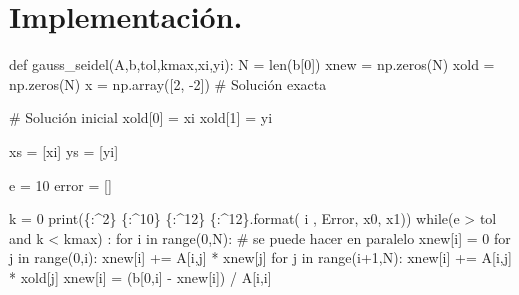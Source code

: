 \documentclass[
  letterpaper,
  DIV=11,
  numbers=noendperiod]{scrreprt}
\newenvironment{Shaded}{\begin{snugshade}}{\end{snugshade}}
\newcommand{\BuiltInTok}[1]{\textcolor[rgb]{0.00,0.23,0.31}{#1}}
\newcommand{\CommentTok}[1]{\textcolor[rgb]{0.37,0.37,0.37}{#1}}
\newcommand{\ControlFlowTok}[1]{\textcolor[rgb]{0.00,0.23,0.31}{#1}}
\newcommand{\DecValTok}[1]{\textcolor[rgb]{0.68,0.00,0.00}{#1}}
\newcommand{\KeywordTok}[1]{\textcolor[rgb]{0.00,0.23,0.31}{#1}}
\newcommand{\NormalTok}[1]{\textcolor[rgb]{0.00,0.23,0.31}{#1}}
\newcommand{\OperatorTok}[1]{\textcolor[rgb]{0.37,0.37,0.37}{#1}}
\newcommand{\SpecialCharTok}[1]{\textcolor[rgb]{0.37,0.37,0.37}{#1}}
\newcommand{\StringTok}[1]{\textcolor[rgb]{0.13,0.47,0.30}{#1}}
\begin{document}
\section{Implementación.}\label{implementaciuxf3n.-2}

\begin{Shaded}
\begin{Highlighting}[]
\KeywordTok{def}\NormalTok{ gauss\_seidel(A,b,tol,kmax,xi,yi):}
\NormalTok{    N }\OperatorTok{=} \BuiltInTok{len}\NormalTok{(b[}\DecValTok{0}\NormalTok{])}
\NormalTok{    xnew }\OperatorTok{=}\NormalTok{ np.zeros(N)}
\NormalTok{    xold }\OperatorTok{=}\NormalTok{ np.zeros(N)}
\NormalTok{    x }\OperatorTok{=}\NormalTok{ np.array([}\DecValTok{2}\NormalTok{, }\OperatorTok{{-}}\DecValTok{2}\NormalTok{]) }\CommentTok{\# Solución exacta}

    \CommentTok{\# Solución inicial}
\NormalTok{    xold[}\DecValTok{0}\NormalTok{] }\OperatorTok{=}\NormalTok{ xi}
\NormalTok{    xold[}\DecValTok{1}\NormalTok{] }\OperatorTok{=}\NormalTok{ yi}

\NormalTok{    xs }\OperatorTok{=}\NormalTok{ [xi]}
\NormalTok{    ys }\OperatorTok{=}\NormalTok{ [yi]}
    
\NormalTok{    e }\OperatorTok{=} \DecValTok{10}
\NormalTok{    error }\OperatorTok{=}\NormalTok{ [] }
    
\NormalTok{    k }\OperatorTok{=} \DecValTok{0}
    \BuiltInTok{print}\NormalTok{(}\StringTok{\textquotesingle{}}\SpecialCharTok{\{:\^{}2\}}\StringTok{ }\SpecialCharTok{\{:\^{}10\}}\StringTok{ }\SpecialCharTok{\{:\^{}12\}}\StringTok{ }\SpecialCharTok{\{:\^{}12\}}\StringTok{\textquotesingle{}}\NormalTok{.}\BuiltInTok{format}\NormalTok{(}\StringTok{\textquotesingle{} i \textquotesingle{}}\NormalTok{, }\StringTok{\textquotesingle{}Error\textquotesingle{}}\NormalTok{, }\StringTok{\textquotesingle{}x0\textquotesingle{}}\NormalTok{, }\StringTok{\textquotesingle{}x1\textquotesingle{}}\NormalTok{))}
    \ControlFlowTok{while}\NormalTok{(e }\OperatorTok{\textgreater{}}\NormalTok{ tol }\KeywordTok{and}\NormalTok{ k }\OperatorTok{\textless{}}\NormalTok{ kmax) :}
        \ControlFlowTok{for}\NormalTok{ i }\KeywordTok{in} \BuiltInTok{range}\NormalTok{(}\DecValTok{0}\NormalTok{,N): }\CommentTok{\# se puede hacer en paralelo}
\NormalTok{            xnew[i] }\OperatorTok{=} \DecValTok{0}
            \ControlFlowTok{for}\NormalTok{ j }\KeywordTok{in} \BuiltInTok{range}\NormalTok{(}\DecValTok{0}\NormalTok{,i):}
\NormalTok{                xnew[i] }\OperatorTok{+=}\NormalTok{ A[i,j] }\OperatorTok{*}\NormalTok{ xnew[j]}
            \ControlFlowTok{for}\NormalTok{ j }\KeywordTok{in} \BuiltInTok{range}\NormalTok{(i}\OperatorTok{+}\DecValTok{1}\NormalTok{,N):}
\NormalTok{                xnew[i] }\OperatorTok{+=}\NormalTok{ A[i,j] }\OperatorTok{*}\NormalTok{ xold[j]                }
\NormalTok{            xnew[i] }\OperatorTok{=}\NormalTok{ (b[}\DecValTok{0}\NormalTok{,i] }\OperatorTok{{-}}\NormalTok{ xnew[i]) }\OperatorTok{/}\NormalTok{ A[i,i]}
            

\end{Highlighting}
\end{Shaded}
\end{document}
